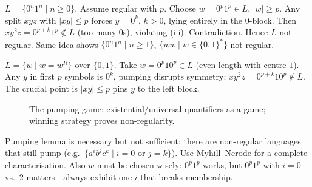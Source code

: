 \begin{example}
$L=\{0^n1^n\mid n\ge0\}$. Assume regular with $p$. Choose $w=0^p1^p\in L$, $|w|\ge p$. Any split $xyz$ with $|xy|\le p$ forces $y=0^k$, $k>0$, lying entirely in the $0$-block. Then $xy^2z=0^{p+k}1^p\notin L$ (too many $0$s), violating (iii). Contradiction. Hence $L$ not regular. Same idea shows $\{0^n1^n\mid n\ge1\}$, $\{ww\mid w\in\{0,1\}^*\}$ not regular.
\end{example}

\begin{example}
$L=\{w\mid w=w^R\}$ over $\{0,1\}$. Take $w=0^p10^p\in L$ (even length with centre $1$). Any $y$ in first $p$ symbols is $0^k$, pumping disrupts symmetry: $xy^2z=0^{p+k}10^p\notin L$. The crucial point is $|xy|\le p$ pins $y$ to the left block.
\end{example}

\begin{figure}[h]
\centering
{}
\caption{The pumping game: existential/universal quantifiers as a game; winning strategy proves non-regularity.}
\label{fig:pumping-game}
\end{figure}

\begin{remark}
Pumping lemma is necessary but not sufficient; there are non-regular languages that still pump (e.g.\ $\{a^ib^jc^k\mid i=0\text{ or }j=k\}$). Use Myhill--Nerode for a complete characterisation. Also $w$ must be chosen wisely: $0^p1^p$ works, but $0^p1^{p}$ with $i=0$ vs.\ $2$ matters---always exhibit one $i$ that breaks membership.
\end{remark}

